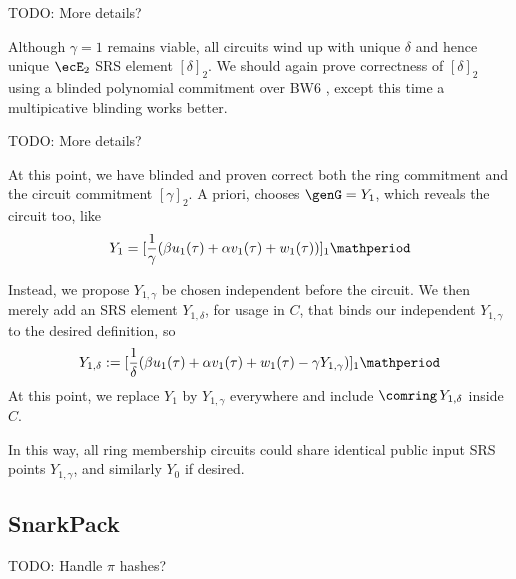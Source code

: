 TODO: More details?

Although $\gamma=1$ remains viable, all circuits wind up with
unique $\delta$ and hence unique $\ecE_2$ SRS element $[\delta]_2$.
We should again prove correctness of $[\delta]_2$ using a
blinded polynomial commitment \cite{KZG} over BW6 \cite{BW6},
except this time a multipicative blinding works better.

TODO: More details?

At this point, we have blinded and proven correct both the
ring commitment \comring and the circuit commitment $[\gamma]_2$.
A priori, \pifast chooses $\genG = Y_1$, which reveals the circuit too, like
$$ Y_1 = [{1\over\gamma} (\beta u_1(\tau) + \alpha v_1(\tau) + w_1(\tau))]_1 \mathperiod $$

Instead, we propose $Y_{1,\gamma}$ be chosen independent before the circuit.
We then merely add an SRS element $Y_{1,\delta}$, for usage in $C$, that binds
 our independent $Y_{1,\gamma}$ to the desired definition, so
$$ Y_{1,\delta} := [{1\over\delta} (\beta u_1(\tau) + \alpha v_1(\tau) + w_1(\tau) - \gamma Y_{1,\gamma})]_1 \mathperiod $$
At this point, we replace $Y_1$ by $Y_{1,\gamma}$ everywhere and
 include $\comring \, Y_{1,\delta}$ inside $C$.

In this way, all ring membership circuits could share identical
public input SRS points $Y_{1,\gamma}$, and similarly $Y_0$ if desired.


\subsection{SnarkPack}

TODO: Handle $\pi$ hashes?


